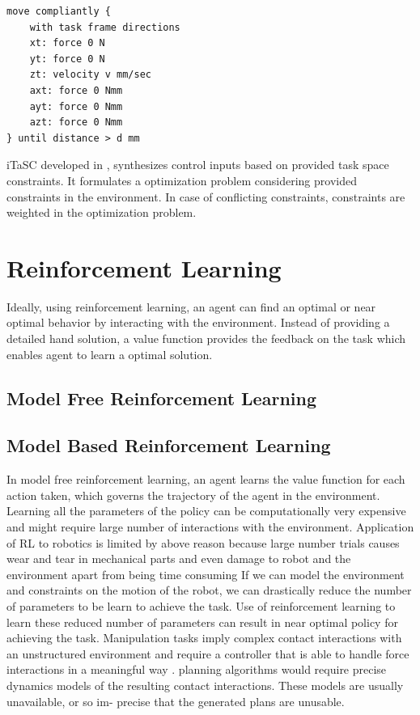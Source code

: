 \documentclass[thesis]{mas_proposal}
\begin{document}
\begin{lstlisting}[label=tff,caption=Task Specification using TFF: Open Door]
move compliantly {
	with task frame directions
	xt: force 0 N
	yt: force 0 N
	zt: velocity v mm/sec
	axt: force 0 Nmm
	ayt: force 0 Nmm
	azt: force 0 Nmm
} until distance > d mm 
\end{lstlisting}


iTaSC developed in \cite{DeSchutter-ijrr2007, DecreBruyninckxDeSchutter2013, decre09}, synthesizes control inputs based on provided task space constraints. It formulates a optimization problem considering provided constraints in the environment. In case of conflicting constraints, constraints are weighted in the optimization problem.  

\chapter{Reinforcement Learning}

Ideally, using reinforcement learning, an agent can find an optimal or near optimal behavior by interacting with the environment. Instead of providing a detailed hand solution, a value function provides the feedback on the task which enables agent to learn a optimal solution.  

\section{Model Free Reinforcement Learning}

\section{Model Based Reinforcement Learning}

In model free reinforcement learning, an agent learns the value function for each action taken, which governs the trajectory of the agent in the environment. Learning all the parameters of the policy can be computationally very expensive and might require large number of interactions with the environment. Application of RL to robotics is limited by above reason because large number trials causes wear and tear in mechanical parts and even damage to robot and the environment apart from being time consuming If we can model the environment and constraints on the motion of the robot, we can drastically reduce the number of parameters to be learn to achieve the task. Use of reinforcement learning to learn these reduced number of parameters can result in near optimal policy for achieving the task. Manipulation tasks imply complex contact interactions with an unstructured environment and require a controller that is able to handle force interactions in a meaningful way \cite{kalakrishnan2011learning}. planning algorithms would require precise dynamics models of the resulting contact interactions. These models are usually unavailable, or so im- precise that the generated plans are unusable\cite{kalakrishnan2011learning}. 
\end{document}
